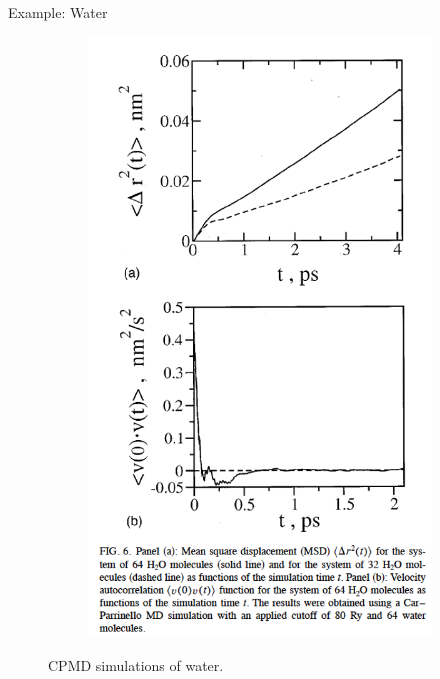 \documentclass[aspectratio=169]{beamer}
\begin{document}
\begin{frame}{Example: Water}
\begin{figure}
\begin{subfigure}{0.2\textwidth}
                \includegraphics[width=\linewidth]{lectures/figures/13-H2O_2.png}
            \end{subfigure}
            \caption{CPMD simulations of water.\cite{izvekovCarParrinelloMolecularDynamics2002}}
            \label{fig}
        \end{figure}
    \end{frame}
\end{document}
